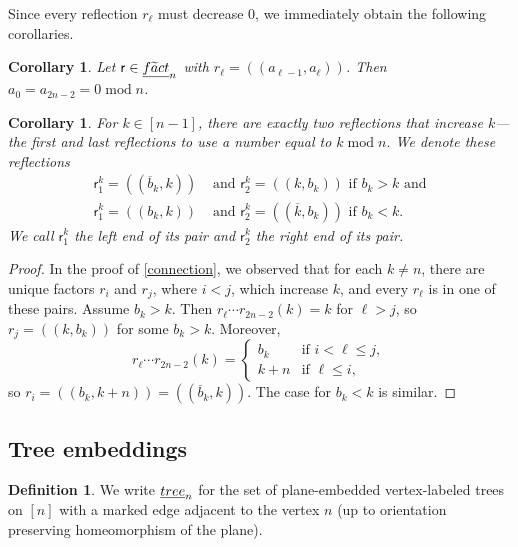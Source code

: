 \documentclass[a4paper,10pt,leqno]{amsart}
\newcommand{\darkred}{\color{darkred}}
\numberwithin{equation}{section}
\newtheorem{corollary}[theorem]{Corollary}
\theoremstyle{definition}
\newtheorem{definition}[theorem]{Definition}
\theoremstyle{remark}
\newcommand{\T}{\textsc{tree}}
\newcommand{\Ft}{\textsc{f}\widetilde{\textsc{a}}\textsc{ct}}
\newcommand{\E}{\T}
\newcommand{\EE}{\underline{\E}}
\newcommand{\EFt}{\underline{\Ft}}
\renewcommand{\mod}{\;\mathrm{mod}\;}
\newcommand{\rr}{\mathsf{r}}
\newcommand{\rrs}{\rr^k_1}
\newcommand{\rrf}{\rr^k_2}
\newcommand{\rrr}{r}
\newcommand{\defn}[1]{\emph{\darkred #1}}
\begin{document}
Since every reflection $r_\ell$ must decrease $0$, we immediately obtain the following corollaries.
\begin{corollary}
\label{cor:zero}
Let $\rr \in \EFt_n$ with $\rrr_\ell = (\!(a_{\ell-1}, a_\ell)\!)$.  Then $a_0 = a_{2n-2} = 0 \mod n$.
\end{corollary}

\begin{corollary}
\label{cor:pairs}
For $k \in [n-1]$, there are exactly two reflections that increase $k$---the first and last reflections to use a number equal to $k \mod n$.  We denote these reflections 
\begin{align*}
\rrs=(\!(\overline{b}_k,k)\!) &\text{ and } \rrf=(\!(k,b_k)\!) \text{ if } b_k>k \text{ and}\\
\rrs=(\!(b_k,k)\!) &\text{ and } \rrf=(\!(\overline{k},b_k)\!) \text{ if } b_k<k.
\end{align*}
We call $\rrs$ the \defn{left end} of its pair and $\rrf$ the \defn{right end} of its pair.
\end{corollary}

\begin{proof}
In the proof of \cref{connection}, we observed that for each $k\neq n$, there are unique factors $\rrr_{i}$ and $\rrr_{j}$, where $i < j$, which increase $k$, and every $\rrr_\ell$ is in one of these pairs. Assume $b_k>k$.  Then $\rrr_\ell\cdots \rrr_{2n-2}(k) = k$ for $\ell > j$, so $\rrr_j = (\!(k, b_k)\!)$ for some $b_k > k$. Moreover, 
    \[
        \rrr_\ell\cdots \rrr_{2n-2}(k) = \begin{cases}
            b_k & \text{if } i< \ell \leq j, \\
            k+n & \text{if } \ell \leq i,
        \end{cases}
    \]
    so $\rrr_i = (\!(b_k, k+n)\!) = (\!(\overline{b}_k,k)\!)$.  The case for $b_k<k$ is similar.
\end{proof}

\subsection{Tree embeddings}
\label{sec:trees}

\begin{definition}
We write $\EE_n$ for the set of plane-embedded vertex-labeled trees on $[n]$ with a marked edge adjacent to the vertex $n$ (up to orientation preserving homeomorphism of the plane).
\end{definition}
\end{document}
